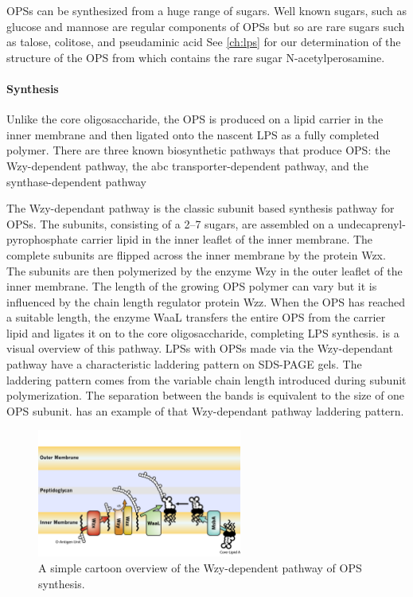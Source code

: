 \Acp{OPS} can be synthesized from a huge range of sugars. Well known sugars, such as glucose and mannose are regular components of \acp{OPS} but so are rare sugars such as talose,
colitose, and pseudaminic acid See \cref{ch:lps} for our determination of the structure of the \ac{OPS} from \caulobacter which contains the rare sugar
N-acetylperosamine.

    \paragraph{Synthesis} Unlike the core oligosaccharide, the \ac{OPS} is produced on a lipid carrier in the inner membrane and then ligated onto the nascent \ac{LPS} as a fully
completed polymer. There are three known biosynthetic pathways that produce \ac{OPS}: the Wzy-dependent pathway, the \ac{abc} transporter-dependent pathway, and the
synthase-dependent pathway

The Wzy-dependant pathway is the classic subunit based synthesis pathway for \acp{OPS}. The subunits, consisting of a 2--7 sugars, are assembled on a undecaprenyl-pyrophosphate
carrier lipid in the inner leaflet of the inner membrane. The complete subunits are flipped across the inner membrane by the protein Wzx. The subunits are then polymerized by the
enzyme Wzy in the outer leaflet of the inner membrane. The length of the growing \ac{OPS} polymer can vary but it is influenced by the chain length regulator protein Wzz. When the
\ac{OPS} has reached a suitable length, the enzyme WaaL transfers the entire \ac{OPS} from the carrier lipid and ligates it on to the core oligosaccharide, completing \ac{LPS}
synthesis.  is a visual overview of this pathway. \Acp{LPS} with \acp{OPS} made via the Wzy-dependant pathway have a characteristic laddering pattern on
\ac{SDS-PAGE} gels. The laddering pattern comes from the variable chain length introduced during subunit polymerization. The separation between the bands is equivalent to the size
of one \ac{OPS} subunit.  has an example of that Wzy-dependant pathway laddering pattern.

\begin{figure}[htb]
  	\begin{center}
   		\includegraphics[width=0.6\textwidth]{intro/img/lpswzy.pdf}
   	\end{center}
   	\caption[A simple overview of the Wzy-dependent pathway]{ A simple cartoon overview of the Wzy-dependent pathway of \ac{OPS} synthesis. }
\label{fig:lpswzy}
\end{figure}


